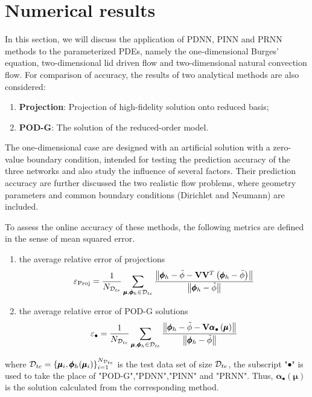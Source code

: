 \documentclass[preprint, 10pt]{elsarticle}
\begin{document}
\section{Numerical results}
In this section,
we will discuss the application of PDNN, PINN and PRNN methods to the parameterized PDEs, namely the one-dimensional Burges' equation, two-dimensional lid driven flow and two-dimensional natural convection flow. For comparison of accuracy, the results of two analytical methods are also considered:
\begin{enumerate}[(1)]
\item \textbf{Projection}: Projection of high-fidelity solution onto reduced basis;
\item \textbf{POD-G}: The solution of the reduced-order model.
\end{enumerate}

The one-dimensional case are designed with an artificial solution with a zero-value boundary condition, intended for testing the prediction accuracy of the three networks and also study the influence of several factors. Their prediction accuracy are further discussed the two realistic flow problems, where geometry parameters and common boundary conditions (Dirichlet and Neumann) are included.

To assess the online accuracy of these methods, the following metrics are defined in the sense of mean squared error.
\begin{enumerate}[(1)]
\item the average relative error of  projections
\begin{equation}
\varepsilon_{\rm{Proj}}
=\frac{1}{N_{{\cal D}_{te}}}
\sum\limits_{\pmb\mu ,\pmb{\phi}_h  \in {{\cal D}_{te}}}{
\frac{\left\| \pmb{\phi}_h - \tilde{\phi} -\mathbf{V}\mathbf{V}^T \left( \pmb{\phi}_h - \tilde{\phi} \right)  \right\|}
{\left\| \pmb{\phi}_h  - \tilde{\phi} \right\|}
}
\end{equation}

\item the average relative error of POD-G solutions
\begin{equation}
\varepsilon_{\bullet}
=\frac{1}{N_{{\cal D}_{te}}}
\sum\limits_{\pmb\mu ,\pmb{\phi}_h  \in {{\cal D}_{te}}}{
\frac{\left\| \pmb{\phi}_h- \tilde{\phi}-\mathbf{V}\pmb{\alpha}_{\bullet}\left( \pmb{\mu}\right)
\right\|}
{\left\| \pmb{\phi}_h - \tilde{\phi} \right\|}
}
\end{equation}

\end{enumerate}
where ${{\cal D}_{te}}=\{\pmb{\mu}_i, \pmb{\phi}_h(\pmb{\mu}_i)\}_{i=1}^{N_{{\cal D}_{te}}}$ is the test data set of size ${{\cal D}_{te}}$, the subscript "$\bullet$" is used to take the place of "POD-G","PDNN","PINN" and "PRNN". Thus, $\pmb{\alpha}_{\bullet}\left( \pmb{\mu}\right)$ is the solution calculated from the corresponding method.
\end{document}
